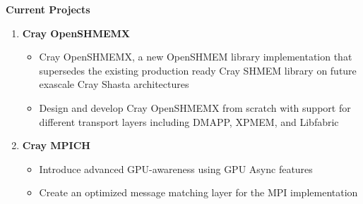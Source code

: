 \textbf{Current Projects}
\begin{enumerate}
\setcounter{enumi}{0}
\item \textbf{Cray OpenSHMEMX}
    \begin{itemize}
        \item Cray OpenSHMEMX, a new OpenSHMEM library implementation that
        supersedes the existing production ready Cray SHMEM library on future
        exascale Cray Shasta architectures
        \item Design and develop Cray OpenSHMEMX from scratch with support for
        different transport layers including DMAPP, XPMEM, and Libfabric
    \end{itemize}

\item \textbf{Cray MPICH}
    \begin{itemize}
        \item Introduce advanced GPU-awareness using GPU Async features
        \item Create an optimized message matching layer for the MPI
        implementation
    \end{itemize}
\end{enumerate}

